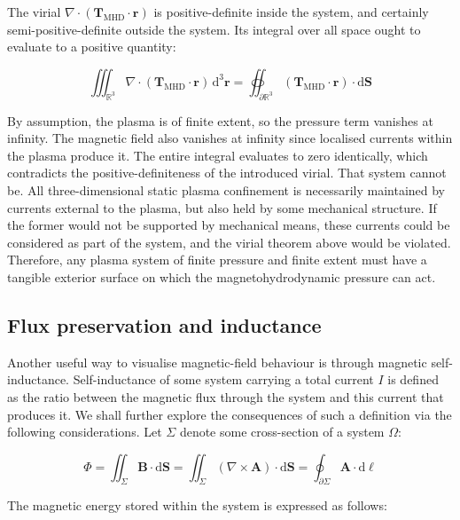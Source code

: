 The virial $\nabla\cdot(\mathbf{T}_\text{MHD}\cdot\mathbf{r})$ is positive-definite inside the system, and certainly semi-positive-definite outside the system. Its integral over all space ought to evaluate to a positive quantity:

\begin{equation}
    \iiint_{\mathbb{R}^3}\nabla\cdot(\mathbf{T}_\text{MHD}\cdot\mathbf{r})\,\mathrm{d}^3\mathbf{r}=\oiint_{\partial\mathbb{R}^3}(\mathbf{T}_\text{MHD}\cdot\mathbf{r})\cdot\mathrm{d}\mathbf{S}
\end{equation}

By assumption, the plasma is of finite extent, so the pressure term vanishes at infinity. The magnetic field also vanishes at infinity since localised currents within the plasma produce it. The entire integral evaluates to zero identically, which contradicts the positive-definiteness of the introduced virial. That system cannot be. All three-dimensional static plasma confinement is necessarily maintained by currents external to the plasma, but also held by some mechanical structure. If the former would not be supported by mechanical means, these currents could be considered as part of the system, and the virial theorem above would be violated. Therefore, any plasma system of finite pressure and finite extent must have a tangible exterior surface on which the magnetohydrodynamic pressure can act.

\subsection{Flux preservation and inductance}

Another useful way to visualise magnetic-field behaviour is through magnetic self-inductance. Self-inductance of some system carrying a total current $I$ is defined as the ratio between the magnetic flux through the system and this current that produces it. We shall further explore the consequences of such a definition via the following considerations. Let ${\Sigma}$ denote some cross-section of a system $\Omega$:

\begin{equation}
    \Phi=\iint_\Sigma\mathbf{B}\cdot\mathrm{d}\mathbf{S}=\iint_\Sigma(\nabla\times\mathbf{A})\cdot\mathrm{d}\mathbf{S}=\oint_{\partial\Sigma}\mathbf{A}\cdot\mathrm{d}\boldsymbol{\ell}
\end{equation}

The magnetic energy stored within the system is expressed as follows:

